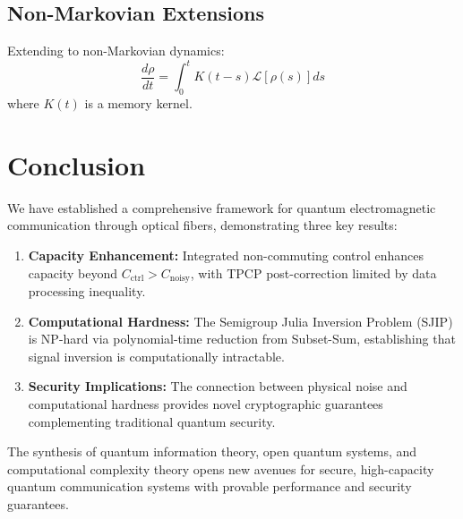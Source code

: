 \documentclass[12pt,a4paper]{article}
\begin{document}
\subsection{Non-Markovian Extensions}

Extending to non-Markovian dynamics:
\begin{equation}
\frac{d\rho}{dt} = \int_0^t K(t-s) \mathcal{L}[\rho(s)] ds
\end{equation}
where $K(t)$ is a memory kernel.

\section{Conclusion}

We have established a comprehensive framework for quantum electromagnetic communication through optical fibers, demonstrating three key results:

\begin{enumerate}
\item \textbf{Capacity Enhancement:} Integrated non-commuting control enhances capacity beyond $C_{\text{ctrl}} > C_{\text{noisy}}$, with TPCP post-correction limited by data processing inequality.

\item \textbf{Computational Hardness:} The Semigroup Julia Inversion Problem (SJIP) is NP-hard via polynomial-time reduction from Subset-Sum, establishing that signal inversion is computationally intractable.

\item \textbf{Security Implications:} The connection between physical noise and computational hardness provides novel cryptographic guarantees complementing traditional quantum security.
\end{enumerate}

The synthesis of quantum information theory, open quantum systems, and computational complexity theory opens new avenues for secure, high-capacity quantum communication systems with provable performance and security guarantees.
\end{document}
